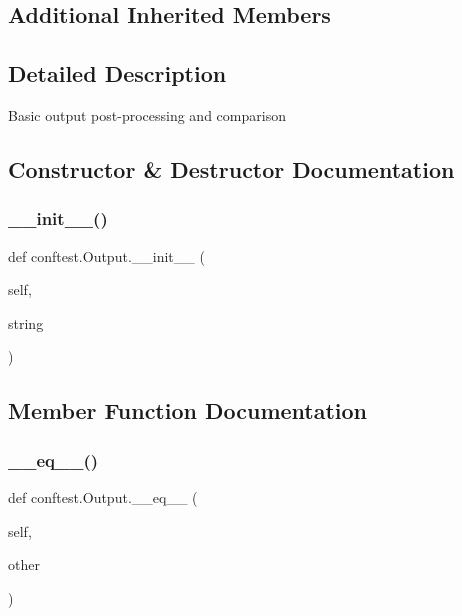 \subsection*{Additional Inherited Members}


\subsection{Detailed Description}
\begin{DoxyVerb}Basic output post-processing and comparison\end{DoxyVerb}
 

\subsection{Constructor \& Destructor Documentation}
\mbox{\label{classconftest_1_1_output_a8ac732a0aea5b25f52285c6337d8b80d}} 
\subsubsection{\texorpdfstring{\_\_init\_\_()}{\_\_init\_\_()}}
{\footnotesize\ttfamily def conftest.\+Output.\+\_\+\+\_\+init\+\_\+\+\_\+ (\begin{DoxyParamCaption}\item[{}]{self,  }\item[{}]{string }\end{DoxyParamCaption})}



\subsection{Member Function Documentation}
\mbox{\label{classconftest_1_1_output_af2d5081d359504c97a4e83d316824f05}} 
\subsubsection{\texorpdfstring{\_\_eq\_\_()}{\_\_eq\_\_()}}
{\footnotesize\ttfamily def conftest.\+Output.\+\_\+\+\_\+eq\+\_\+\+\_\+ (\begin{DoxyParamCaption}\item[{}]{self,  }\item[{}]{other }\end{DoxyParamCaption})}




